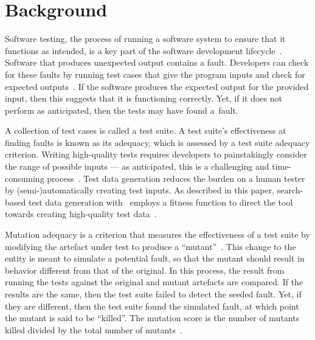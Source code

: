 \section{Background}\label{sec:background}


Software testing, the process of running a software system to ensure that it functions as intended, is a key part of the
software development lifecycle~\cite{Kapfhammer2004}. Software that produces unexpected output contains a
fault. Developers can check for these faults by running test cases that give the program inputs and check for expected
outputs~\cite{Kapfhammer2010}. If the software produces the expected output for the provided input, then this suggests
that it is functioning correctly. Yet, if it does not perform as anticipated, then the tests may have found \mbox{a
fault}.


A collection of test cases is called a test suite. A test suite's effectiveness at finding faults is known as its
adequacy, which is assessed by a test suite adequacy criterion.  Writing high-quality tests requires developers to
painstakingly consider the range of possible inputs --- as anticipated, this is a challenging and time-consuming
process~\cite{Fraser2015}. Test data generation reduces the burden on a human tester by (semi-)automatically creating
test inputs. As described in this paper, search-based test data generation with \sa~employs a fitness function to direct
the tool towards creating high-quality test data~\cite{STVR:STVR294}.



Mutation adequacy is a criterion that measures the effectiveness of a test suite by modifying the artefact under test to
produce a ``mutant''~\cite{Just2011a}. This change to the entity is meant to simulate a potential fault, so that the
mutant should result in behavior different from that of the original. In this process, the result from running the tests
against the original and mutant artefacts are compared. If the results are the same, then the test suite failed to
detect the seeded fault. Yet, if they are different, then the test suite found the simulated fault, at which point the
mutant is said to be ``killed''. The mutation score is the number of mutants killed divided by the total number of
mutants~\cite{Just2012b}.

